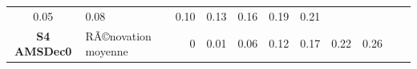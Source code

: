 \documentclass[]{article}
\begin{document}
\begin{longtable}[]{@{}clrrrrrrrrr@{}}
\begin{minipage}[t]{0.05\columnwidth}
0.05\strut
\end{minipage} & \begin{minipage}[t]{0.05\columnwidth}\raggedleft\strut
0.08\strut
\end{minipage} & \begin{minipage}[t]{0.05\columnwidth}\raggedleft\strut
0.10\strut
\end{minipage} & \begin{minipage}[t]{0.05\columnwidth}\raggedleft\strut
0.13\strut
\end{minipage} & \begin{minipage}[t]{0.05\columnwidth}\raggedleft\strut
0.16\strut
\end{minipage} & \begin{minipage}[t]{0.05\columnwidth}\raggedleft\strut
0.19\strut
\end{minipage} & \begin{minipage}[t]{0.05\columnwidth}\raggedleft\strut
0.21\strut
\end{minipage}\tabularnewline
\begin{minipage}[t]{0.12\columnwidth}\centering\strut
\textbf{S4 AMSDec0}\strut
\end{minipage} & \begin{minipage}[t]{0.17\columnwidth}\raggedright\strut
RÃ©novation moyenne\strut
\end{minipage} & \begin{minipage}[t]{0.05\columnwidth}\raggedleft\strut
0\strut
\end{minipage} & \begin{minipage}[t]{0.05\columnwidth}\raggedleft\strut
0.01\strut
\end{minipage} & \begin{minipage}[t]{0.05\columnwidth}\raggedleft\strut
0.06\strut
\end{minipage} & \begin{minipage}[t]{0.05\columnwidth}\raggedleft\strut
0.12\strut
\end{minipage} & \begin{minipage}[t]{0.05\columnwidth}\raggedleft\strut
0.17\strut
\end{minipage} & \begin{minipage}[t]{0.05\columnwidth}\raggedleft\strut
0.22\strut
\end{minipage} & \begin{minipage}[t]{0.05\columnwidth}\raggedleft\strut
0.26\strut
\end{minipage} & \begin{minipage}[t]{0.05\columnwidth}\raggedleft\strut

\end{minipage}
\end{longtable}
\end{document}
